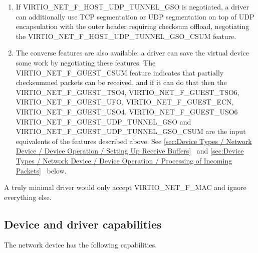 \begin{enumerate}
\item If VIRTIO_NET_F_HOST_UDP_TUNNEL_GSO is negotiated, a driver can
  additionally use TCP segmentation or UDP segmentation on top of UDP
  encapsulation with the outer header requiring checksum offload,
  negotiating the VIRTIO_NET_F_HOST_UDP_TUNNEL_GSO_CSUM feature.

\item The converse features are also available: a driver can save
  the virtual device some work by negotiating these features.
   The VIRTIO_NET_F_GUEST_CSUM feature indicates that partially
  checksummed packets can be received, and if it can do that then
  the VIRTIO_NET_F_GUEST_TSO4, VIRTIO_NET_F_GUEST_TSO6,
  VIRTIO_NET_F_GUEST_UFO, VIRTIO_NET_F_GUEST_ECN, VIRTIO_NET_F_GUEST_USO4,
  VIRTIO_NET_F_GUEST_USO6 VIRTIO_NET_F_GUEST_UDP_TUNNEL_GSO and
  VIRTIO_NET_F_GUEST_UDP_TUNNEL_GSO_CSUM are the input equivalents of
  the features described above.
  See \ref{sec:Device Types / Network Device / Device Operation /
Setting Up Receive Buffers}~ and
\ref{sec:Device Types / Network Device / Device Operation /
Processing of Incoming Packets}~ below.
\end{enumerate}

A truly minimal driver would only accept VIRTIO_NET_F_MAC and ignore
everything else.

\subsection{Device and driver capabilities}\label{sec:Device Types / Network Device / Device and driver capabilities}

The network device has the following capabilities.

